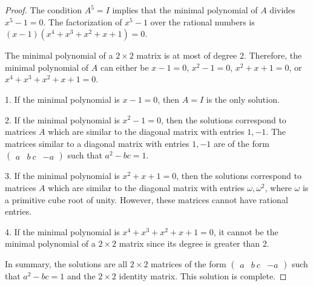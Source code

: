 \documentclass{amsart}
\theoremstyle{plain}
\begin{document}
\begin{proof}The condition $A^5 = I$ implies that the minimal polynomial of $A$ divides $x^5 - 1 = 0$. The factorization of $x^5 - 1$ over the rational numbers is $(x-1)(x^4+x^3+x^2+x+1) = 0$. 

The minimal polynomial of a $2 \times 2$ matrix is at most of degree 2. Therefore, the minimal polynomial of $A$ can either be $x-1=0$, $x^2-1=0$, $x^2+x+1=0$, or $x^4+x^3+x^2+x+1=0$.

1. If the minimal polynomial is $x-1=0$, then $A=I$ is the only solution.

2. If the minimal polynomial is $x^2-1=0$, then the solutions correspond to matrices $A$ which are similar to the diagonal matrix with entries $1,-1$. The matrices similar to a diagonal matrix with entries $1,-1$ are of the form $\begin{pmatrix} a & b \ c & -a \end{pmatrix}$ such that $a^2 - bc = 1$.

3. If the minimal polynomial is $x^2+x+1=0$, then the solutions correspond to matrices $A$ which are similar to the diagonal matrix with entries $\omega, \omega^2$, where $\omega$ is a primitive cube root of unity. However, these matrices cannot have rational entries.

4. If the minimal polynomial is $x^4+x^3+x^2+x+1=0$, it cannot be the minimal polynomial of a $2 \times 2$ matrix since its degree is greater than 2.

In summary, the solutions are all $2 \times 2$ matrices of the form $\begin{pmatrix} a & b \ c & -a \end{pmatrix}$ such that $a^2 - bc = 1$ and the $2 \times 2$ identity matrix. This solution is complete.
\end{proof}
\end{document}
